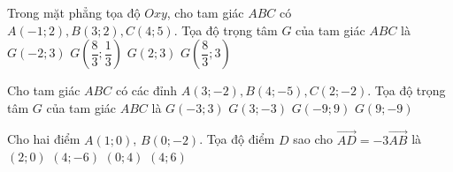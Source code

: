 \begin{ex}%
	Trong mặt phẳng tọa độ $Oxy$,  cho tam giác $ABC$ có $A(-1;2), B(3;2), C(4;5)$. Tọa độ trọng tâm $G$ của tam giác $ABC$ là
	\choice
	{$G(-2;3)$}
	{$G\left(\dfrac{8}{3} ;\dfrac{1}{3}\right)$}
	{\True $G(2;3)$}
	{$G\left(\dfrac{8}{3} ;3\right)$}
\end{ex}

\begin{ex}%
	Cho tam giác $ABC$ có các đỉnh $A(3 ;-2), B(4 ;-5), C(2 ;-2)$. Tọa độ trọng tâm $G$ của tam giác $A B C$ là
	\choice
	{$G(-3 ; 3)$}
	{\True $G(3 ;-3)$}
	{$G(-9 ; 9)$}
	{$G(9 ;-9)$}
\end{ex}

\begin{ex}%
	Cho hai điểm $A(1;0)$, $B(0;-2)$. Tọa độ điểm $D$ sao cho $\overrightarrow{AD}=-3\overrightarrow{AB}$ là
	\choice
	{$(2;0)$}
	{$(4;-6)$}
	{$(0;4)$}
	{\True $(4;6)$}
\end{ex}

